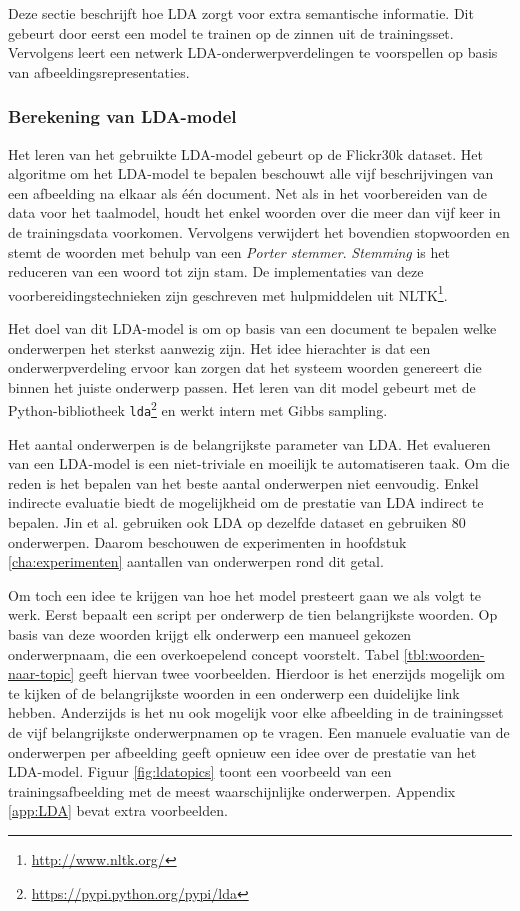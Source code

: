 Deze sectie beschrijft hoe LDA zorgt voor extra semantische informatie. Dit gebeurt door eerst een model te trainen op de zinnen uit de trainingsset. Vervolgens leert een netwerk LDA-onderwerpverdelingen te voorspellen op basis van afbeeldingsrepresentaties.

\subsubsection{Berekening van LDA-model}
\label{subs:Berekening van onderwerpverdeling}
Het leren van het gebruikte LDA-model gebeurt op de Flickr30k dataset. Het algoritme om het LDA-model te bepalen beschouwt alle vijf beschrijvingen van een afbeelding na elkaar als \'e\'en document. Net als in het voorbereiden van de data voor het taalmodel, houdt het enkel woorden over die meer dan vijf keer in de trainingsdata voorkomen. Vervolgens verwijdert het bovendien stopwoorden en stemt de woorden met behulp van een \emph{Porter stemmer}. \emph{Stemming} is het reduceren van een woord tot zijn stam. De implementaties van deze voorbereidingstechnieken zijn geschreven met hulpmiddelen uit NLTK\footnote{\url{http://www.nltk.org/}}.

Het doel van dit LDA-model is om op basis van een document te bepalen welke onderwerpen het sterkst aanwezig zijn. Het idee hierachter is dat een onderwerpverdeling ervoor kan zorgen dat het systeem woorden genereert die binnen het juiste onderwerp passen. Het leren van dit model gebeurt met de Python-bibliotheek \texttt{lda}\footnote{\url{https://pypi.python.org/pypi/lda}} en werkt intern met Gibbs sampling.

Het aantal onderwerpen is de belangrijkste parameter van LDA. Het evalueren van een LDA-model is een niet-triviale en moeilijk te automatiseren taak. Om die reden is het bepalen van het beste aantal onderwerpen niet eenvoudig. Enkel indirecte evaluatie biedt de mogelijkheid om de prestatie van LDA indirect te bepalen. Jin et al.\cite{Jin2015} gebruiken ook LDA op dezelfde dataset en gebruiken 80 onderwerpen. Daarom beschouwen de experimenten in hoofdstuk \ref{cha:experimenten} aantallen van onderwerpen rond dit getal. 

Om toch een idee te krijgen van hoe het model presteert gaan we als volgt te werk. Eerst bepaalt een script per onderwerp de tien belangrijkste woorden. Op basis van deze woorden krijgt elk onderwerp een manueel gekozen onderwerpnaam, die een overkoepelend concept voorstelt. Tabel \ref{tbl:woorden-naar-topic} geeft hiervan twee voorbeelden. 
Hierdoor is het enerzijds mogelijk om te kijken of de belangrijkste woorden in een onderwerp een duidelijke link hebben. Anderzijds is het nu ook mogelijk voor elke afbeelding in de trainingsset de vijf belangrijkste onderwerpnamen op te vragen. Een manuele evaluatie van de onderwerpen per afbeelding geeft opnieuw een idee over de prestatie van het LDA-model. Figuur \ref{fig:ldatopics} toont een voorbeeld van een trainingsafbeelding met de meest waarschijnlijke onderwerpen. Appendix \ref{app:LDA} bevat extra voorbeelden.

